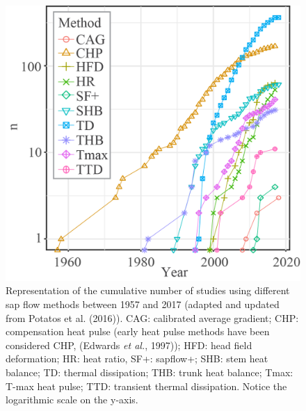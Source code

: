 \documentclass[11pt,twoside]{reedthesis}
\begin{document}
\setlength{\abovecaptionskip}{15pt}
\begin{figure}[hbt!]

{\centering \includegraphics[width=0.6\linewidth]{figure/appendixA/fig1} 

}

\caption[Representation of the cumulative number of studies using different sap flow methods between 1957 and 2017]{Representation of the cumulative number of studies using
different sap flow methods between 1957 and 2017 (adapted and updated
from Potatos et al. (2016)). CAG: calibrated average gradient; CHP:
compensation heat pulse (early heat pulse methods have been considered
CHP, (Edwards \emph{et al.}, 1997)); HFD: head field deformation; HR:
heat ratio, SF+: sapflow+; SHB: stem heat balance; TD: thermal
dissipation; THB: trunk heat balance; Tmax: T-max heat pulse; TTD:
transient thermal dissipation. Notice the logarithmic scale on the
y-axis.}\label{fig:apa11}
\end{figure}
\setlength{\abovecaptionskip}{0pt} \newpage
\end{document}
